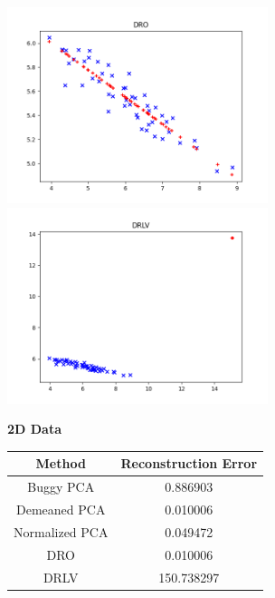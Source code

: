 \begin{itemize}
\begin{soln}
\begin{center}
  \end{center}
  \includegraphics[width=3in]{../figs/dro.png}
  \includegraphics[width=3in]{../figs/drlv.png}

  \begin{center}
    \textbf{2D Data} \\
    \begin{tabular}{ c  c }
      \hline
      Method & Reconstruction Error \\ \hline
      Buggy PCA & 0.886903 \\
      Demeaned PCA & 0.010006 \\
      Normalized PCA & 0.049472 \\
      DRO & 0.010006 \\
      DRLV & 150.738297 \\
      \hline
    \end{tabular}
  \end{center}


\end{soln}
\end{itemize}
